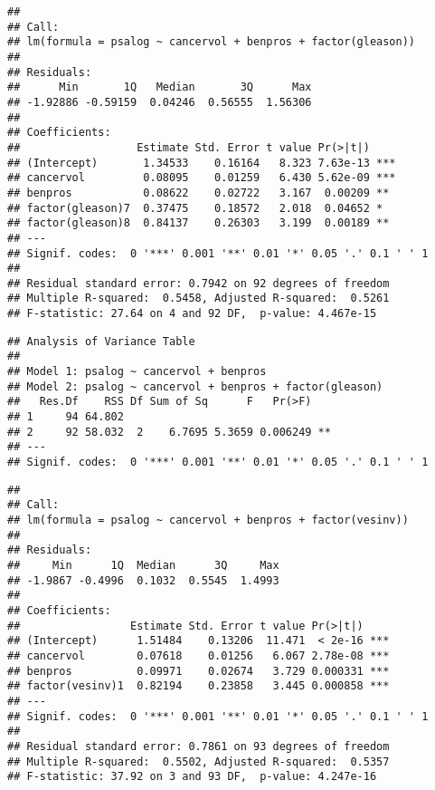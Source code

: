 \begin{knitrout}
\begin{kframe}
\begin{alltt}
\end{alltt}
\begin{verbatim}
##
## Call:
## lm(formula = psalog ~ cancervol + benpros + factor(gleason))
##
## Residuals:
##      Min       1Q   Median       3Q      Max
## -1.92886 -0.59159  0.04246  0.56555  1.56306
##
## Coefficients:
##                  Estimate Std. Error t value Pr(>|t|)
## (Intercept)       1.34533    0.16164   8.323 7.63e-13 ***
## cancervol         0.08095    0.01259   6.430 5.62e-09 ***
## benpros           0.08622    0.02722   3.167  0.00209 **
## factor(gleason)7  0.37475    0.18572   2.018  0.04652 *
## factor(gleason)8  0.84137    0.26303   3.199  0.00189 **
## ---
## Signif. codes:  0 '***' 0.001 '**' 0.01 '*' 0.05 '.' 0.1 ' ' 1
##
## Residual standard error: 0.7942 on 92 degrees of freedom
## Multiple R-squared:  0.5458, Adjusted R-squared:  0.5261
## F-statistic: 27.64 on 4 and 92 DF,  p-value: 4.467e-15
\end{verbatim}
\begin{alltt}
\end{alltt}
\begin{verbatim}
## Analysis of Variance Table
##
## Model 1: psalog ~ cancervol + benpros
## Model 2: psalog ~ cancervol + benpros + factor(gleason)
##   Res.Df    RSS Df Sum of Sq      F   Pr(>F)
## 1     94 64.802
## 2     92 58.032  2    6.7695 5.3659 0.006249 **
## ---
## Signif. codes:  0 '***' 0.001 '**' 0.01 '*' 0.05 '.' 0.1 ' ' 1
\end{verbatim}
\begin{alltt}
\end{alltt}
\begin{verbatim}
##
## Call:
## lm(formula = psalog ~ cancervol + benpros + factor(vesinv))
##
## Residuals:
##     Min      1Q  Median      3Q     Max
## -1.9867 -0.4996  0.1032  0.5545  1.4993
##
## Coefficients:
##                 Estimate Std. Error t value Pr(>|t|)
## (Intercept)      1.51484    0.13206  11.471  < 2e-16 ***
## cancervol        0.07618    0.01256   6.067 2.78e-08 ***
## benpros          0.09971    0.02674   3.729 0.000331 ***
## factor(vesinv)1  0.82194    0.23858   3.445 0.000858 ***
## ---
## Signif. codes:  0 '***' 0.001 '**' 0.01 '*' 0.05 '.' 0.1 ' ' 1
##
## Residual standard error: 0.7861 on 93 degrees of freedom
## Multiple R-squared:  0.5502, Adjusted R-squared:  0.5357
## F-statistic: 37.92 on 3 and 93 DF,  p-value: 4.247e-16
\end{verbatim}

\end{kframe}
\end{knitrout}
